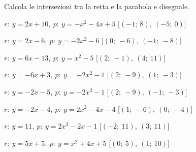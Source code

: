 \begin{esercizio}\label{ese:}
 Calcola le intersezioni tra la retta e la parabola e disegnale.
 \begin{enumeratea}
  \item  \(r:~y = 2 x +10,~p:~y=- x^2 -4 x +5\)
   \hfill [\(\left (-1;~8 \right ),~\left (-5;~0 \right )\)]
  \item  \(r:~y = 2 x -6,~p:~y=-2 x^2 -6\)
   \hfill [\(\left (0;~-6 \right ),~\left (-1;~-8 \right )\)]
  \item  \(r:~y = 6 x -13,~p:~y=x^2 -5\)
   \hfill [\(\left (2;~-1 \right ),~\left (4;~11 \right )\)]
  \item  \(r:~y = -6 x +3,~p:~y=-2 x^2 -1\)
   \hfill [\(\left (2;~-9 \right ),~\left (1;~-3 \right )\)]
  \item  \(r:~y = -2 x -5,~p:~y=-2 x^2 -1\)
   \hfill [\(\left (2;~-9 \right ),~\left (-1;~-3 \right )\)]
  \item  \(r:~y = -2 x -4,~p:~y=2 x^2 -4 x -4\)
   \hfill [\(\left (1;~-6 \right ),~\left (0;~-4 \right )\)]
  \item  \(r:~y = 11,~p:~y=2 x^2 -2 x -1\)
   \hfill [\(\left (-2;~11 \right ),~\left (3;~11 \right )\)]
  \item  \(r:~y = 5 x +5,~p:~y=x^2 +4 x +5\)
   \hfill [\(\left (0;~5 \right ),~\left (1;~10 \right )\)]

\end{enumeratea}
\end{esercizio}

